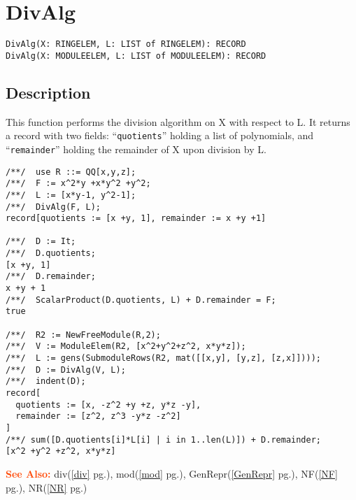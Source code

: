 \documentclass[a4paper]{mybook}
\newenvironment{command}{}{} %
\newcommand\SeeAlso{\par\textcolor{OrangeRed}{\textbf{\large See Also: }}}
\begin{document}
\section{DivAlg}
\label{DivAlg}
\begin{command} %


\begin{Verbatim}[label=syntax, rulecolor=\color{MidnightBlue},
frame=single]
DivAlg(X: RINGELEM, L: LIST of RINGELEM): RECORD
DivAlg(X: MODULEELEM, L: LIST of MODULEELEM): RECORD
\end{Verbatim}


\subsection*{Description}

This function performs the division algorithm on X with respect to L.
It returns a record with two fields: ``\verb&quotients&'' holding a list of
polynomials, and ``\verb&remainder&'' holding the remainder of X upon division
by L.
\begin{Verbatim}[label=example, rulecolor=\color{PineGreen}, frame=single]
/**/  use R ::= QQ[x,y,z];
/**/  F := x^2*y +x*y^2 +y^2;
/**/  L := [x*y-1, y^2-1];
/**/  DivAlg(F, L);
record[quotients := [x +y, 1], remainder := x +y +1]

/**/  D := It;
/**/  D.quotients;
[x +y, 1]
/**/  D.remainder;
x +y + 1
/**/  ScalarProduct(D.quotients, L) + D.remainder = F;
true

/**/  R2 := NewFreeModule(R,2);
/**/  V := ModuleElem(R2, [x^2+y^2+z^2, x*y*z]);
/**/  L := gens(SubmoduleRows(R2, mat([[x,y], [y,z], [z,x]])));
/**/  D := DivAlg(V, L);
/**/  indent(D);
record[
  quotients := [x, -z^2 +y +z, y*z -y],
  remainder := [z^2, z^3 -y*z -z^2]
]
/**/ sum([D.quotients[i]*L[i] | i in 1..len(L)]) + D.remainder;
[x^2 +y^2 +z^2, x*y*z]
\end{Verbatim}


\SeeAlso %
  div(\ref{div} pg.\pageref{div}), 
    mod(\ref{mod} pg.\pageref{mod}), 
    GenRepr(\ref{GenRepr} pg.\pageref{GenRepr}), 
    NF(\ref{NF} pg.\pageref{NF}), 
    NR(\ref{NR} pg.\pageref{NR})
\end{command} %
\end{document}
